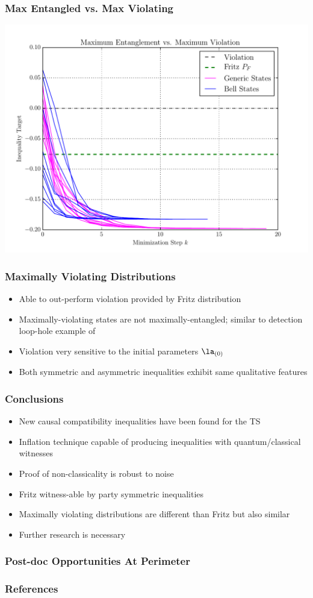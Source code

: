 \documentclass[
    hyperref={bookmarks=false},%
    xcolor={dvipsnames},
]{beamer}
\begin{document}
\begin{frame}
    \frametitle{Max Entangled vs. Max Violating} %
    \includegraphics[width=\linewidth]{../../figures/optimizations/Max_Entanglement_vs_Max_Violation_fritz_seed.pdf}
\end{frame}

\begin{frame}
    \frametitle{Maximally Violating Distributions}
    \begin{itemize}
        \item Able to out-perform violation provided by Fritz distribution
        \item Maximally-violating states are not maximally-entangled; similar to detection loop-hole example of \cite{Methot_2006}
        \item Violation very sensitive to the initial parameters $\la_{(0)}$
        \item Both symmetric and asymmetric inequalities exhibit same qualitative features
    \end{itemize}
\end{frame}

\begin{frame}
    \frametitle{Conclusions}
    \begin{itemize}
        \item New causal compatibility inequalities have been found for the TS
        \item Inflation technique capable of producing inequalities with quantum/classical witnesses
        \item Proof of non-classicality is robust to noise
        \item Fritz witness-able by party symmetric inequalities
        \item Maximally violating distributions are different than Fritz but also similar
        \item Further research is necessary
    \end{itemize}
\end{frame}

\begin{frame}
    \frametitle{Post-doc Opportunities At Perimeter}
\end{frame}


\begin{frame}[allowframebreaks]
    \frametitle{References}
    \printbibliography
\end{frame}
\end{document}

